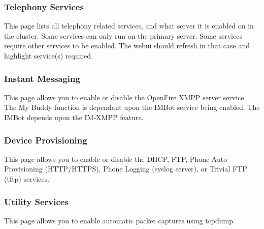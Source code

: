 \documentclass[letterpaper,10pt,english]{sphinxmanual}
\begin{document}
\subsubsection{Telephony Services}
\label{\detokenize{webui:telephony-services}}\label{\detokenize{webui:id29}}
This page lists all telephony related services, and what server it is enabled on in the cluster. Some services can only run on the primary server. Some services require other services to be enabled. The webui should refresh in that case and highlight service(s) required.
\begin{quote}

\end{quote}


\subsubsection{Instant Messaging}
\label{\detokenize{webui:instant-messaging}}\label{\detokenize{webui:id30}}
This page allows you to enable or disable the OpenFire XMPP server service. The My Buddy function is dependant upon the IMBot service being enabled. The IMBot depends upon the IM-XMPP feature.
\begin{quote}

\end{quote}


\subsubsection{Device Provisioning}
\label{\detokenize{webui:device-provisioning}}\label{\detokenize{webui:id31}}
This page allows you to enable or disable the DHCP, FTP, Phone Auto Provisioning (HTTP/HTTPS), Phone Logging (syslog server), or Trivial FTP (tftp) services.
\begin{quote}

\end{quote}


\subsubsection{Utility Services}
\label{\detokenize{webui:utility-services}}\label{\detokenize{webui:id32}}
This page allows you to enable automatic packet captures using tcpdump.
\end{document}
